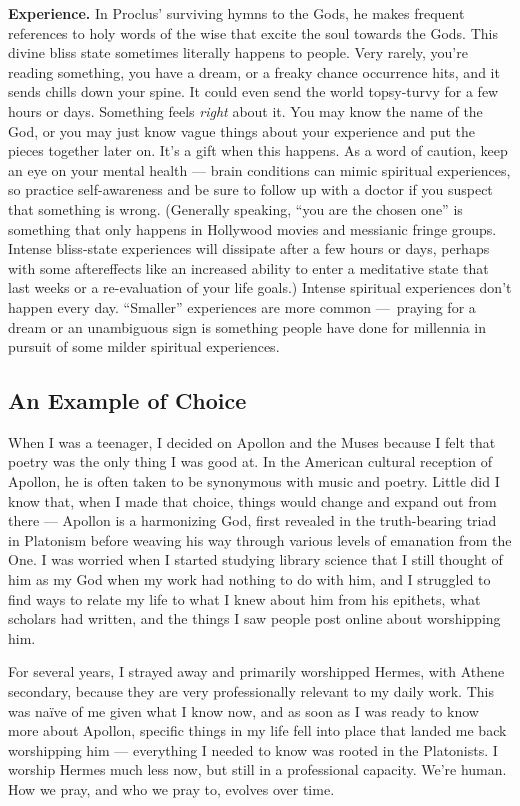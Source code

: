 \documentclass[
]{book}
\begin{document}
\textbf{Experience.} In Proclus' surviving hymns to the Gods, he makes frequent references to holy words of the wise that excite the soul towards the Gods. This divine bliss state sometimes literally happens to people. Very rarely, you're reading something, you have a dream, or a freaky chance occurrence hits, and it sends chills down your spine. It could even send the world topsy-turvy for a few hours or days. Something feels \emph{right} about it. You may know the name of the God, or you may just know vague things about your experience and put the pieces together later on. It's a gift when this happens. As a word of caution, keep an eye on your mental health --- brain conditions can mimic spiritual experiences, so practice self-awareness and be sure to follow up with a doctor if you suspect that something is wrong. (Generally speaking, ``you are the chosen one'' is something that only happens in Hollywood movies and messianic fringe groups. Intense bliss-state experiences will dissipate after a few hours or days, perhaps with some aftereffects like an increased ability to enter a meditative state that last weeks or a re-evaluation of your life goals.) Intense spiritual experiences don't happen every day. ``Smaller'' experiences are more common ---~praying for a dream or an unambiguous sign is something people have done for millennia in pursuit of some milder spiritual experiences.

\hypertarget{an-example-of-choice}{%
\subsection{An Example of Choice}\label{an-example-of-choice}}

When I was a teenager, I decided on Apollon and the Muses because I felt that poetry was the only thing I was good at. In the American cultural reception of Apollon, he is often taken to be synonymous with music and poetry. Little did I know that, when I made that choice, things would change and expand out from there --- Apollon is a harmonizing God, first revealed in the truth-bearing triad in Platonism before weaving his way through various levels of emanation from the One. I was worried when I started studying library science that I still thought of him as my God when my work had nothing to do with him, and I struggled to find ways to relate my life to what I knew about him from his epithets, what scholars had written, and the things I saw people post online about worshipping him.

For several years, I strayed away and primarily worshipped Hermes, with Athene secondary, because they are very professionally relevant to my daily work. This was naïve of me given what I know now, and as soon as I was ready to know more about Apollon, specific things in my life fell into place that landed me back worshipping him --- everything I needed to know was rooted in the Platonists. I worship Hermes much less now, but still in a professional capacity. We're human. How we pray, and who we pray to, evolves over time.
\end{document}
